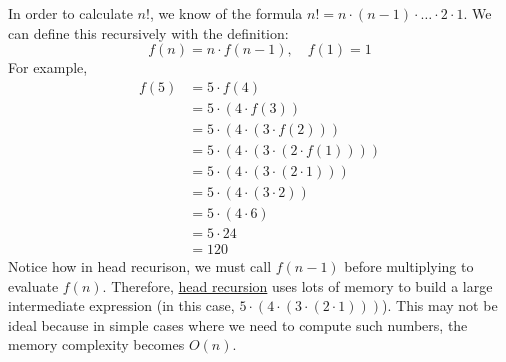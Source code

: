   \begin{example}
    \label{ex:factorials-with-head-recursion}
    In order to calculate $n!$, we know of the formula $n! = n \cdot (n-1) \cdot \ldots \cdot 2 \cdot 1$. We can define this recursively with the definition: 
    \begin{equation}
      f(n) = n \cdot f(n-1), \quad f(1) = 1
    \end{equation}
    For example, 
    \begin{align}
      f(5) & = 5 \cdot f(4) \\ 
           & = 5 \cdot (4 \cdot f(3)) \\ 
           & = 5 \cdot (4 \cdot (3 \cdot f(2))) \\ 
           & = 5 \cdot (4 \cdot (3 \cdot (2 \cdot f(1)))) \\ 
           & = 5 \cdot (4 \cdot (3 \cdot (2 \cdot 1))) \\  
           & = 5 \cdot (4 \cdot (3 \cdot 2)) \\  
           & = 5 \cdot (4 \cdot 6) \\  
           & = 5 \cdot 24 \\  
           & = 120
    \end{align}
    Notice how in head recurison, we must call $f(n-1)$ before multiplying to evaluate $f(n)$. Therefore, \hyperref[def:head-recursion]{head recursion} uses lots of memory to build a large intermediate expression (in this case, $5 \cdot (4 \cdot (3 \cdot (2 \cdot 1)))$). This may not be ideal because in simple cases where we need to compute such numbers, the memory complexity becomes $O(n)$. 
  \end{example}

